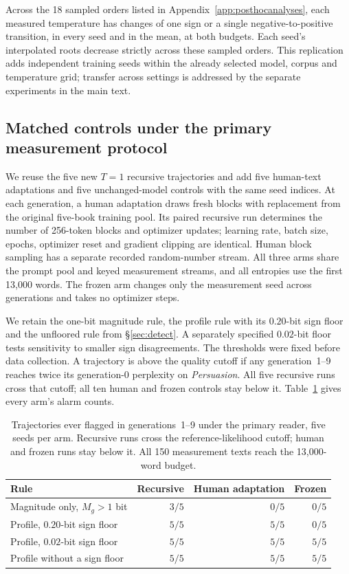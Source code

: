 \documentclass[10pt]{article}
\theoremstyle{plain}
\theoremstyle{definition}
\begin{document}
Across the 18 sampled orders listed in Appendix~\ref{app:posthocanalyses}, each measured
temperature has changes of one sign or a single negative-to-positive transition, in every seed
and in the mean, at both budgets. Each seed's interpolated roots decrease strictly across
these sampled orders. This replication adds independent training seeds within the already
selected model, corpus and temperature grid; transfer across settings is addressed by the
separate experiments in the main text.

\subsection{Matched controls under the primary measurement protocol}
\label{app:freshcontrols}

We reuse the five new $T=1$ recursive trajectories and add five human-text adaptations and
five unchanged-model controls with the same seed indices. At each generation, a human
adaptation draws fresh blocks with replacement from the original five-book training pool.
Its paired recursive run determines the number of 256-token blocks and optimizer updates;
learning rate, batch size, epochs, optimizer reset and gradient clipping are identical.
Human block sampling has a separate recorded random-number stream. All three arms share
the prompt pool and keyed measurement streams, and all entropies use the first 13,000 words.
The frozen arm changes only the measurement seed across generations and takes no optimizer steps.

We retain the one-bit magnitude rule, the profile rule with its $0.20$-bit sign floor and the
unfloored rule from \S\ref{sec:detect}. A separately specified $0.02$-bit floor tests sensitivity
to smaller sign disagreements. The thresholds were fixed before data collection. A trajectory
is above the quality cutoff if any generation~1--9 reaches twice its generation-0 perplexity
on \emph{Persuasion}. All five recursive runs cross that cutoff; all ten human and frozen
controls stay below it. Table~\ref{tab:freshcontrols} gives every arm's alarm counts.

\begin{table}[ht]
\centering\small
\caption{Trajectories ever flagged in generations~1--9 under the primary reader, five seeds
per arm. Recursive runs cross the reference-likelihood cutoff; human and frozen runs stay below
it. All 150 measurement texts reach the 13,000-word budget.}
\label{tab:freshcontrols}
\begin{tabular}{lrrr}
\toprule
Rule & Recursive & Human adaptation & Frozen \\
\midrule
Magnitude only, $M_g>1$ bit & $3/5$ & $0/5$ & $0/5$ \\
Profile, $0.20$-bit sign floor & $5/5$ & $5/5$ & $0/5$ \\
Profile, $0.02$-bit sign floor & $5/5$ & $5/5$ & $5/5$ \\
Profile without a sign floor & $5/5$ & $5/5$ & $5/5$ \\
\bottomrule
\end{tabular}
\end{table}
\end{document}
